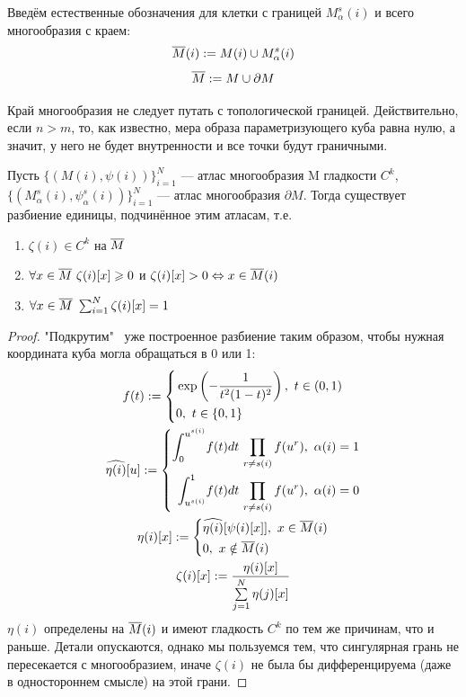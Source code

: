 \begin{designation}
	Введём естественные обозначения для клетки с границей $M_\alpha^s(i)$ и всего многообразия с краем:
	\[
		\overline{M}(i) := M(i) \cup M_\alpha^s(i)
	\]
	\[
		\overline{M} := M \cup \partial M
	\]
\end{designation}

\begin{anote}
	Край многообразия не следует путать с топологической границей. Действительно, если $n > m$, то, как известно, мера образа параметризующего куба равна нулю, а значит, у него не будет внутренности и все точки будут граничными.
\end{anote}

\begin{lemma}
	Пусть $\{(M(i), \psi(i))\}_{i=1}^N$ --- атлас многообразия M гладкости $C^k$, \\ $\{(M_\alpha^s(i), \psi_\alpha^s(i))\}_{i=1}^N$ --- атлас многообразия $\partial M$. Тогда существует разбиение единицы, подчинённое этим атласам, т.е.
	\begin{enumerate}
		\item
		$\zeta(i) \in C^k$ на $\overline{M}$
		\item
		$\forall x \in \overline{M} \ \zeta(i)[x] \geqslant 0$ и $\zeta(i)[x] > 0 \Leftrightarrow x \in \overline{M}(i)$
		\item
		$\forall x \in \overline{M} \ \sum_{i=1}^N \zeta(i)[x] = 1$
	\end{enumerate}
\end{lemma}

\begin{proof}
	"Подкрутим" \ уже построенное разбиение таким образом, чтобы нужная координата куба могла обращаться в 0 или 1:
	\begin{gather*}
		f(t) := \System{
			&\exp\ps{-\frac{1}{t^2(1-t)^2}}, \ t \in (0, 1) \\
			&0, \ t \in \{0, 1\}
		}
		\\
		\widehat{\eta(i)}[u] := \System{
			\int_0^{u^{s(i)}} \! f(t)dt \, \prod_{r \neq s(i)} f(u^r), \ \alpha(i) = 1
			\\
			\int_{u^{s(i)}}^1 \! f(t)dt \, \prod_{r \neq s(i)} f(u^r), \ \alpha(i) = 0}
		\\
		\eta(i)[x] := \System{
			&{\widehat{\eta(i)}[\psi(i)[x]], \ x \in \ole{M}(i)}
			\\
			&{0, \ x \notin \ole{M}(i)}}
		\\
		\zeta(i)[x] := \frac {\eta(i)[x]} {\sum\limits_{j=1}^N \eta(j)[x]}
	\end{gather*}
	$\eta(i)$ определены на $\overline{M}(i)$ и имеют гладкость $C^k$ по тем же причинам, что и раньше. Детали опускаются, однако мы пользуемся тем, что сингулярная грань не пересекается с многообразием, иначе $\zeta(i)$ не была бы дифференцируема (даже в одностороннем смысле) на этой грани.
\end{proof}

